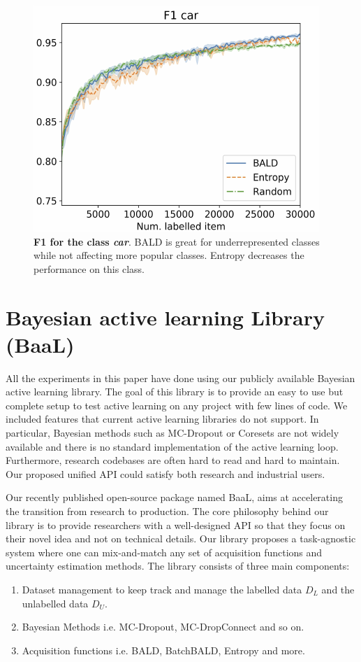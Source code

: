 \documentclass{article}
\begin{document}
\begin{figure}
    \centering
    \includegraphics{fig/F1_Mio_tcd_annex.pdf}
    \caption{\textbf{F1 for the class \textit{car}}. BALD is great for underrepresented classes while not affecting more popular classes. Entropy decreases the performance on this class.}
    \label{fig:miotcd}
\end{figure}


\section{Bayesian active learning Library (BaaL)}

All the experiments in this paper have done using our publicly available Bayesian active learning library.  The goal of this library is to provide an easy to use but complete setup to test active learning on any project with few lines of code. We included features that current active learning libraries do not support. In particular, Bayesian methods such as MC-Dropout or Coresets are not widely available and there is no standard implementation of the active learning loop. Furthermore, research codebases are often hard to read and hard to maintain. Our proposed unified API could satisfy both research and industrial users.

 Our recently published open-source package named BaaL, aims at accelerating the transition from research to production. The core philosophy behind our library is to provide researchers with a well-designed API so that they focus on their novel idea and not on technical details. Our library proposes a task-agnostic system where one can mix-and-match any set of acquisition functions and uncertainty estimation methods.
The library consists of three main components:
\begin{enumerate}
    \item Dataset management to keep track and manage the labelled data $D_L$ and the unlabelled data $D_U$.
    \item Bayesian Methods i.e. MC-Dropout, MC-DropConnect and so on.
    \item Acquisition functions i.e. BALD, BatchBALD, Entropy and more.
\end{enumerate}
\end{document}
